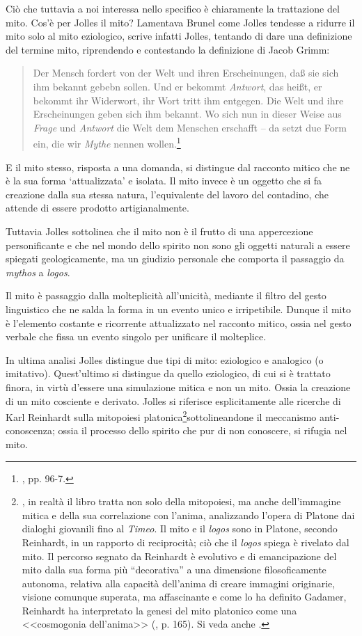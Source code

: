 \documentclass[12pt,a4paper,openright, oneside]{book}
\begin{document}
Ciò che tuttavia a noi interessa nello specifico è chiaramente la trattazione del mito. Cos'è per Jolles il mito? Lamentava Brunel come Jolles tendesse a ridurre il mito solo al mito eziologico, scrive infatti Jolles, tentando di dare una definizione del termine mito, riprendendo e contestando la definizione di Jacob Grimm:
\begin{quote}\begin{singlespace}
\footnotesize Der Mensch fordert von der Welt und ihren Erscheinungen, da{\ss} sie sich ihm bekannt gebebn sollen. Und er bekommt \textit{Antwort}, das hei{\ss}t, er bekommt ihr Widerwort, ihr Wort tritt ihm entgegen. Die Welt und ihre Erscheinungen geben sich ihm bekannt. Wo sich nun in dieser Weise aus \textit{Frage} und \textit{Antwort} die Welt dem Menschen erschafft -- da setzt due Form ein, die wir \textit{Mythe} nennen wollen.\footnote{\cite{Jolles}, pp. 96-7.}
\end{singlespace}\end{quote}
E il mito stesso, risposta a una domanda, si distingue dal racconto mitico che ne è la sua forma `attualizzata' e isolata. Il mito invece è un oggetto che si fa creazione dalla sua stessa natura, l'equivalente del lavoro del contadino, che attende di essere prodotto artigianalmente.

Tuttavia Jolles sottolinea che il mito non è il frutto di una appercezione personificante e che nel mondo dello spirito non sono gli oggetti naturali a essere spiegati geologicamente, ma un giudizio personale che comporta il passaggio da \textit{mythos} a \textit{logos}.

Il mito è passaggio dalla molteplicità all'unicità, mediante il filtro del gesto linguistico che ne salda la forma in un evento unico e irripetibile.
Dunque il mito è l'elemento costante e ricorrente attualizzato nel racconto mitico, ossia nel gesto verbale che fissa un evento singolo per unificare il molteplice.

In ultima analisi Jolles distingue due tipi di mito: eziologico e analogico (o imitativo). Quest'ultimo si distingue da quello eziologico, di cui si è trattato finora, in virtù d'essere una simulazione mitica e non un mito. Ossia la creazione di un mito cosciente e derivato. Jolles si riferisce esplicitamente alle ricerche di Karl Reinhardt sulla mitopoiesi platonica\footnote{\cite{Reinhardt}, in realtà il libro tratta non solo della mitopoiesi, ma anche dell'immagine mitica e della sua correlazione con l'anima, analizzando l'opera di Platone dai dialoghi giovanili fino al \textit{Timeo}. Il mito e il \textit{logos} sono in Platone, secondo Reinhardt, in  un rapporto di reciprocità; ciò che il \textit{logos} spiega è rivelato dal mito. Il percorso segnato da Reinhardt è evolutivo e di emancipazione del mito dalla sua forma più ``decorativa'' a una dimensione filosoficamente autonoma, relativa alla capacità dell'anima di creare immagini originarie, visione comunque superata, ma affascinante e come lo ha definito Gadamer, Reinhardt ha interpretato la genesi del mito platonico come una <<cosmogonia dell'anima>> (\cite{Gadamer}, p. 165). Si veda anche \cite{Busch}.}sottolineandone il meccanismo anti-conoscenza; ossia il processo dello spirito che pur di non conoscere, si rifugia nel mito.
\end{document}
